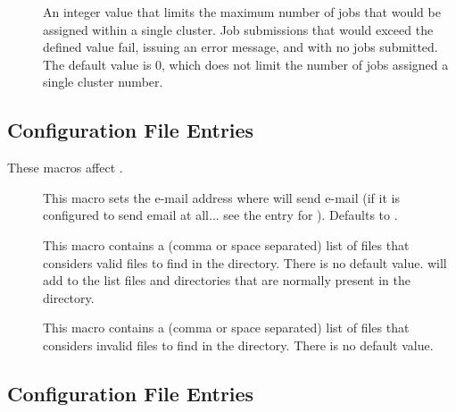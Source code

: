 \begin{description}
\item[]
  \label{param:SubmitMaxProcsInCluster}
  An integer value that limits the maximum number of jobs that would
  be assigned within a single cluster.  Job submissions that would exceed
  the defined value fail, issuing an error message, and with no jobs
  submitted.
  The default value is 0, which does not limit the number of jobs
  assigned a single cluster number.

\end{description}

\subsection{\label{sec:Preen-Config-File-Entries}
Configuration File Entries}

These macros affect .

\begin{description}

\item[] \label{param:PreenAdmin}  This macro
  sets the e-mail address where  will send e-mail (if
  it is configured to send email at all... see the entry for
  ).  Defaults to .

\item[] \label{param:ValidSpoolFiles}  This
  macro contains a (comma or space separated) list of files that
   considers valid files to find in the 
  directory. There is no default value.  will add to the
  list files and directories that are normally present in the
   directory.
  
\item[] \label{param:InvalidLogFiles} This
  macro contains a (comma or space separated) list of files that
   considers invalid files to find in the 
  directory.  There is no default value.

\end{description}


\subsection{\label{sec:Collector-Config-File-Entries}
Configuration File Entries}

